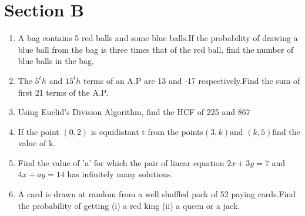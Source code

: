 \documentclass[journal,12pt,twocolumn]{IEEEtran}
\renewcommand\thesection{\arabic{section}}
\begin{document}
\section{Section B}
\renewcommand{\theequation}{\theenumi}
\begin{enumerate}[label=\thesection.\arabic*.,ref=\thesection.\theenumi]
 \item A bag contains 5 red balls and some blue balls.If the probability of drawing a blue ball from the bag is three times that of the red ball, find the number of blue balls in the bag.\\

\item The $5^th$ and $15^th$ terms of an A.P are 13 and -17 respectively.Find the sum of first 21 terms of the A.P.\\

\item Using Euclid's Division Algorithm, find the HCF of 225 and 867\\

\item If the point $(0,2)$ is equidistant
t from the points$(3,k)$and $(k,5)$find the value of k.\\

\item Find the value of 'a' for which the pair of linear equation $2x+3y=7$ and $4x+ay=14$ has infinitely many solutions.\\

\item A card is drawn at random from a well shuffled pack of 52 paying cards.Find the probability of getting (i) a red king (ii) a queen or a jack.\\
\end{enumerate}
\end{document}
